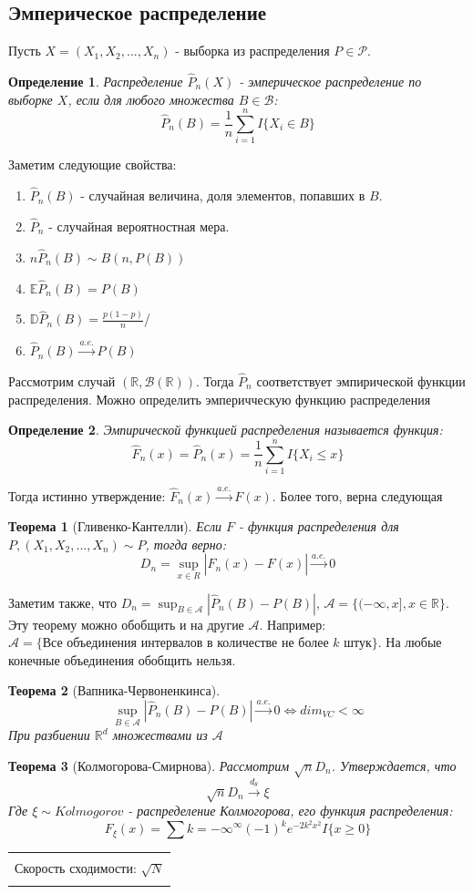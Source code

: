 \documentclass[a4paper,12pt]{article}
\newcommand{\expec}{\mathbb{E}}
\newcommand{\disp}{\mathbb{D}}
\newcommand{\sconv}{\overset{a. e.}{\to}}
\newcommand{\dconvt}{\overset{d_{\theta}}{\to}}
\newcommand{\sumin}{\sum\limits_{i=1}^n}
\newcommand{\sample}{X_1, X_2, ..., X_n}
\newcommand{\R}{\mathbb{R}}
\newenvironment{annotation}{\begin{center}
    \begin{tabular}{|p{0.9\textwidth}|}
    \hline\\
}
{ 
    \\\\\hline
    \end{tabular} 
    \end{center}
}
\newtheorem{dfn}{Определение}[section]
\theoremstyle{named}
\newtheorem*{namedtheorem}{Теорема}
\begin{document}
\subsection{Эмперическое распределение}
Пусть $X=(\sample)$ - выборка из распределения $P \in \mathcal{P}$. 
\begin{dfn}
    Распределение $\hat P_n(X)$ - эмперическое распределение по выборке $X$, если для любого множества $B \in \mathcal{B}$:
    $$
        \hat P_n(B) = \frac{1}{n}\sumin I \{ X_i \in B\}
    $$
\end{dfn}
Заметим следующие свойства:
\begin{enumerate}
    \item $\hat P_n(B)$ - случайная величина, доля элементов, попавших в $B$.
    \item $\hat P_n$ - случайная вероятностная мера. 
    \item $n \hat P_n (B) \sim B(n, P(B))$
    \item $\expec \hat P_n(B) = P(B)$
    \item $\disp \hat P_n(B) = \frac{p(1-p)}{n}$/
    \item $\hat P_n(B) \sconv P(B)$
\end{enumerate}
Рассмотрим случай $(\R, \mathcal{B(\R)})$. Тогда $\hat P_n$ соответствует эмпирической функции распределения. Можно 
определить эмперичческую функцию распределения
\begin{dfn}
    Эмпирической функцией распределения называется функция:
    $$
        \hat F_n(x) = \hat P_n(x) = \frac{1}{n}\sumin I\{ X_i \leq x\}
    $$
\end{dfn}
Тогда истинно утверждение: $\hat F_n(x) \sconv F(x)$. Более того, верна следующая
\begin{namedtheorem}[Гливенко-Кантелли]
    Если $F$ - функция распределения для $P, (\sample) \sim P$, тогда верно: 
    $$
        D_n = \sup_{x\in R} |\hat F_n(x) - F(x)| \sconv 0
    $$
\end{namedtheorem}
Заметим также, что $D_n = \sup_{B \in \mathcal{A}} | \hat P_n(B) - P(B)|$, 
$\mathcal{A} = \{(-\infty, x], x \in \R\}$. Эту теорему можно обобщить 
и на другие $\mathcal{A}$. Например: $\mathcal{A} = \{ \text{Все объединения интервалов в количестве 
не более $k$ штук}\}$. На любые конечные объединения обобщить нельзя. 
\begin{namedtheorem}[Вапника-Червоненкинса]
    $$
        \sup_{B\in \mathcal{A}} |\hat P_n(B) - P(B)| \sconv 0 \Leftrightarrow dim_{VC} < \infty 
    $$      
    При разбиении $\R^d$ множествами из $\mathcal{A}$
\end{namedtheorem}
\begin{namedtheorem}[Колмогорова-Смирнова]
    Рассмотрим $\sqrt{n}D_n$. Утверждается, что 
    $$
        \sqrt{n}D_n \dconvt \xi
    $$
    Где $\xi \sim Kolmogorov$  - распределение Колмогорова, его функция распределения:
    $$
        F_\xi(x) = \sum{k=-\infty}^\infty (-1)^ke^{-2k^2x^2}I\{x \geq 0\}
    $$
\end{namedtheorem}
\begin{annotation}
    Скорость сходимости: $\sqrt{N}$
\end{annotation}
\end{document}
